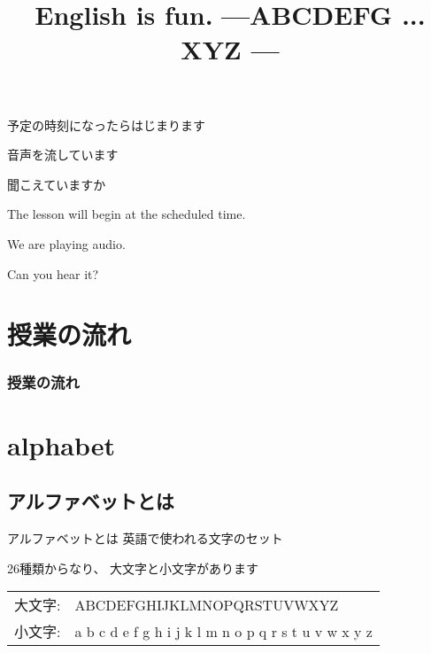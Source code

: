 \documentclass[aspectratio=169,xcolor={dvipsnames,table}]{beamer}
\title{English is fun.\,\,{}---ABCDEFG ... XYZ ---}
\author{}
\institute[]{}
\date[]
\begin{document}
\begin{frame}{}
\label{section}
\thispagestyle{empty}
\Large

\raggedright

予定の時刻になったらはじまります

\textbullet  音声を流しています

\textbullet  聞こえていますか　

\vfill

\raggedleft

The lesson will begin at the scheduled time.

\vspace{-6pt}

We are playing audio.

\vspace{-6pt}

Can you hear it?
\end{frame}

\begin{frame}
\label{section-1}
\thispagestyle{empty}
\titlepage
\end{frame}


\section*{授業の流れ}
\begin{frame}[plain]
  \frametitle{授業の流れ}
  \tableofcontents
\end{frame}

\section{alphabet}
\subsection{アルファベットとは}

\begin{frame}[plain]{アルファベットとは}
\Large
\pause
英語で使われる文字のセット\pause

\bigskip

26種類からなり、\pause
大文字と小文字があります\pause

\begin{rmfamily}
\begin{tabular}{lp{}}
大文字:& ABCDEFGHIJKLMNOPQRSTUVWXYZ\\\pause
小文字:& a b c d e f g h i j k l m n o p q r s t u v w x y z
\end{tabular}

\end{rmfamily}

\end{frame}
\end{document}
